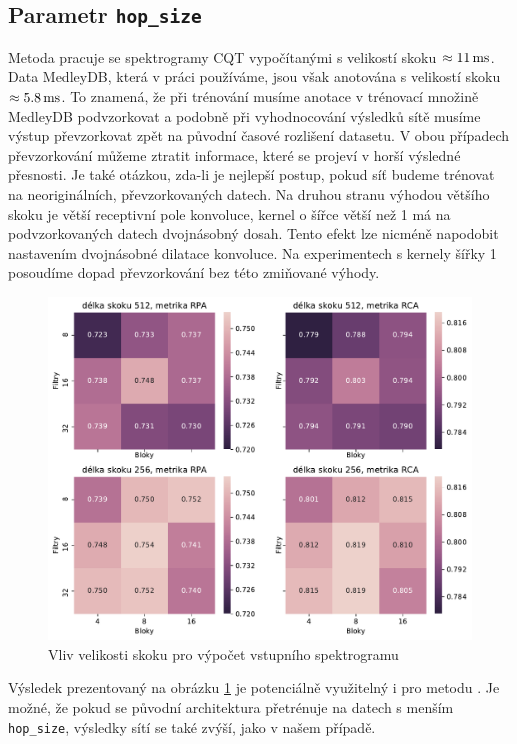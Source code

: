 \subsection{Parametr \texttt{hop\_size}}

Metoda \cite{Bittner2017} pracuje se spektrogramy CQT vypočítanými s velikostí skoku $\approx 11\,\rm ms$. Data MedleyDB, která v práci používáme, jsou však anotována s velikostí skoku $\approx 5.8\,\rm ms$. To znamená, že při trénování musíme anotace v trénovací množině MedleyDB podvzorkovat a podobně při vyhodnocování výsledků sítě musíme výstup převzorkovat zpět na původní časové rozlišení datasetu. V obou případech převzorkování můžeme ztratit informace, které se projeví v horší výsledné přesnosti. Je také otázkou, zda-li je nejlepší postup, pokud síť budeme trénovat na neoriginálních, převzorkovaných datech. Na druhou stranu výhodou většího skoku je větší receptivní pole konvoluce, kernel o šířce větší než 1 má na podvzorkovaných datech dvojnásobný dosah. Tento efekt lze nicméně napodobit nastavením dvojnásobné dilatace konvoluce. Na experimentech s kernely šířky 1 posoudíme dopad převzorkování bez této zmiňované výhody.

\begin{figure}[h]\centering
    \includegraphics[scale=0.6]{../img/figures/spectrogram_512_vs_256}
\caption{Vliv velikosti skoku pro výpočet vstupního spektrogramu}\label{obr:spectrogram_512_vs_256}
\end{figure}

Výsledek prezentovaný na obrázku \ref{obr:spectrogram_512_vs_256} je potenciálně využitelný i pro metodu \cite{Bittner2017}. Je možné, že pokud se původní architektura přetrénuje na datech s menším \texttt{hop\_size}, výsledky sítí se také zvýší, jako v našem případě.

